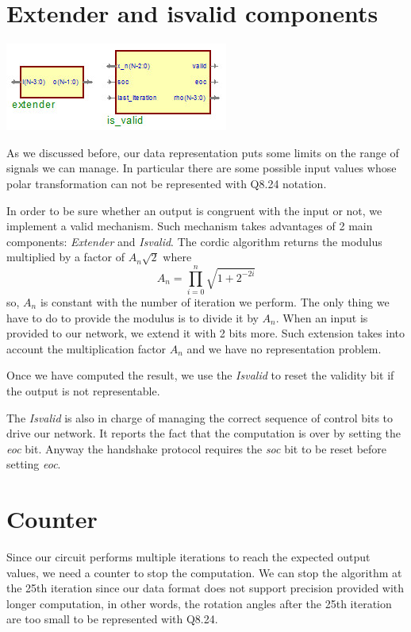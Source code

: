 \documentclass[12pt,a4paper]{report}
\begin{document}
\section{Extender and is\textunderscore valid components}
\begin{center}
\includegraphics{img/isvalid.jpg}
\end{center}
As we discussed before, our data representation puts some limits on the range of signals we can manage. In particular there are some possible input values whose polar transformation can not be represented with Q8.24 notation.

In order to be sure whether an output is congruent with the input or not, we implement a valid mechanism.
Such mechanism takes advantages of 2 main components: \emph{Extender} and \emph{Is\textunderscore valid}.
The cordic algorithm returns the modulus multiplied by a factor of $A_{n}\sqrt{2}$ where 
\begin{equation}
A_n = \prod_{i = 0}^n{\sqrt{1+2^{-2i}}}
\end{equation}
so, $A_n$ is constant with the number of iteration we perform. The only thing we have to do to provide the modulus is to divide it by $A_n$.
When an input is provided to our network, we extend it with 2 bits more. Such extension takes into account the multiplication factor $A_n$ and we have no representation problem.

Once we have computed the result, we use the \emph{Is\textunderscore valid} to reset the validity bit if the output is not representable.

The \emph{Is\textunderscore valid} is also in charge of managing the correct sequence of control bits to drive our network. It reports the fact that the computation is over by setting the \emph{eoc} bit. Anyway the handshake protocol requires the \emph{soc} bit to be reset before setting \emph{eoc}.

\section{Counter}
Since our circuit performs multiple iterations to reach the expected output values, we need a counter to stop the computation.
We can stop the algorithm at the 25th iteration since our data format does not support precision provided with longer computation, in other words, the rotation angles after the 25th iteration are too small to be represented with Q8.24.
\end{document}
